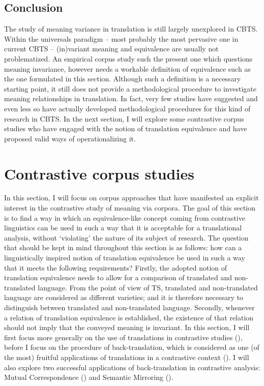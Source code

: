 \subsection{\label{sec:2.2.5}  Conclusion}

The study of meaning variance in translation is still largely unexplored in CBTS. Within the universals paradigm – most probably the most pervasive one in current CBTS – (in)variant meaning and equivalence are usually not problematized. An empirical corpus study such the present one which questions meaning invariance, however needs a workable definition of equivalence such as the one formulated in this section. Although such a definition is a necessary starting point, it still does not provide a methodological procedure to investigate meaning relationships in translation. In fact, very few studies have suggested and even less so have actually developed methodological procedures for this kind of research in CBTS. In the next section, I will explore some contrastive corpus studies who have engaged with the notion of translation equivalence and have proposed valid ways of operationalizing it.


\section{\label{sec:2.3}  Contrastive corpus studies}

In this section, I will focus on corpus approaches that have manifested an explicit interest in the contrastive study of meaning via corpora. The goal of this section is to find a way in which an equivalence-like concept coming from contrastive linguistics can be used in such a way that it is acceptable for a translational analysis, without ‘violating’ the nature of its subject of research. The question that should be kept in mind throughout this section is as follows: how can a linguistically inspired notion of translation equivalence be used in such a way that it meets the following requirements? Firstly, the adopted notion of translation equivalence needs to allow for a comparison of translated and non-translated language. From the point of view of TS, translated and non-translated language are considered as different varieties; and it is therefore necessary to distinguish between translated and non-translated language. Secondly, whenever a relation of translation equivalence is established, the existence of that relation should not imply that the conveyed meaning is invariant. In this section, I will first focus more generally on the use of translations in contrastive studies (), before I focus on the procedure of back-translation, which is considered as one (of the most) fruitful applications of translations in a contrastive context (). I will also explore two successful applications of back-translation in contrastive analysis: Mutual Correspondence () and Semantic Mirroring ().


